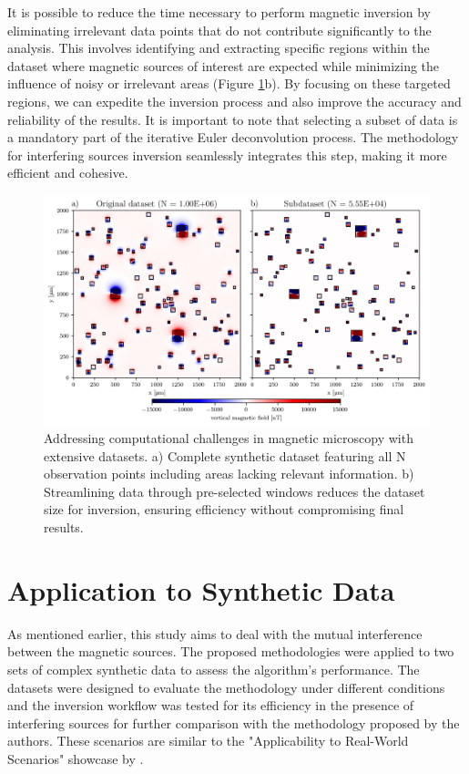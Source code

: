 It is possible to reduce the time necessary to perform magnetic inversion by eliminating irrelevant data points that do not contribute significantly to the analysis. This involves identifying and extracting specific regions within the dataset where magnetic sources of interest are expected while minimizing the influence of noisy or irrelevant areas (Figure \ref{methodology}b). By focusing on these targeted regions, we can expedite the inversion process and also improve the accuracy and reliability of the results. It is important to note that selecting a subset of data is a mandatory part of the iterative Euler deconvolution process. The methodology for interfering sources inversion seamlessly integrates this step, making it more efficient and cohesive.


\begin{figure}[tb!]
  \centering
  \includegraphics[width=1\linewidth]{figures/methodology.png}
  \caption{
    Addressing computational challenges in magnetic microscopy with extensive datasets.
    a) Complete synthetic dataset featuring all N observation points including areas lacking relevant information.
    b) Streamlining data through pre-selected windows reduces the dataset size for inversion, ensuring efficiency without compromising final results.
      }
  \label{methodology}
\end{figure}


\section{Application to Synthetic Data}

As mentioned earlier, this study aims to deal with the mutual interference between the magnetic sources. The proposed methodologies were applied to two sets of complex synthetic data to assess the algorithm's performance. The datasets were designed to evaluate the methodology under different conditions and the inversion workflow was tested for its efficiency in the presence of interfering sources for further comparison with the methodology proposed by the authors. These scenarios are similar to the "Applicability to Real-World Scenarios" showcase by \citet{Souza-Junior2023b}. 

